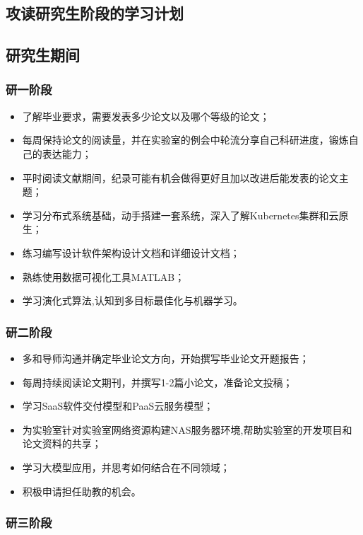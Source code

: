 \documentclass{article}
\begin{document}
\begin{bibunit}[alpha]
\section{攻读研究生阶段的学习计划}

\subsection{研究生期间}
\subsubsection{研一阶段}

\begin{itemize}[parsep=0.5ex]
	\item 了解毕业要求，需要发表多少论文以及哪个等级的论文；
	\item 每周保持论文的阅读量，并在实验室的例会中轮流分享自己科研进度，锻炼自己的表达能力；
	\item 平时阅读文献期间，纪录可能有机会做得更好且加以改进后能发表的论文主题；
	\item 学习分布式系统基础，动手搭建一套系统，深入了解Kubernetes集群和云原生；
	\item 练习编写设计软件架构设计文档和详细设计文档；
	\item 熟练使用数据可视化工具MATLAB；
	\item 学习演化式算法,认知到多目标最佳化与机器学习。
	\end{itemize}
	
	\subsubsection{研二阶段}
	\begin{itemize}[parsep=0.5ex]
	\item 多和导师沟通并确定毕业论文方向，开始撰写毕业论文开题报告；
	\item 每周持续阅读论文期刊，并撰写1-2篇小论文，准备论文投稿；
	\item 学习SaaS软件交付模型和PaaS云服务模型；
	\item 为实验室针对实验室网络资源构建NAS服务器环境,帮助实验室的开发项目和论文资料的共享；
	\item 学习大模型应用，并思考如何结合在不同领域；
	\item 积极申请担任助教的机会。
	\end{itemize}
	
	\subsubsection{研三阶段}
	

\end{bibunit}
\end{document}
